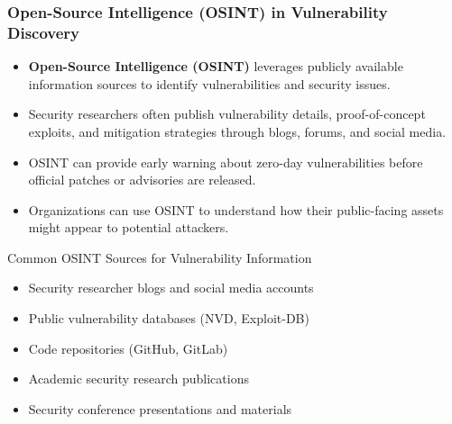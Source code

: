 \documentclass{beamer}
\begin{document}
\begin{frame}
\frametitle{Open-Source Intelligence (OSINT) in Vulnerability Discovery}
\begin{itemize}
\item \textbf{Open-Source Intelligence (OSINT)} leverages publicly available information sources to identify vulnerabilities and security issues.
\item Security researchers often publish vulnerability details, proof-of-concept exploits, and mitigation strategies through blogs, forums, and social media.
\item OSINT can provide early warning about zero-day vulnerabilities before official patches or advisories are released.
\item Organizations can use OSINT to understand how their public-facing assets might appear to potential attackers.
\end{itemize}

\begin{block}{Common OSINT Sources for Vulnerability Information}
\scriptsize
\begin{itemize}
\item Security researcher blogs and social media accounts
\item Public vulnerability databases (NVD, Exploit-DB)
\item Code repositories (GitHub, GitLab)
\item Academic security research publications
\item Security conference presentations and materials
\end{itemize}
\end{block}
\end{frame}
\end{document}
